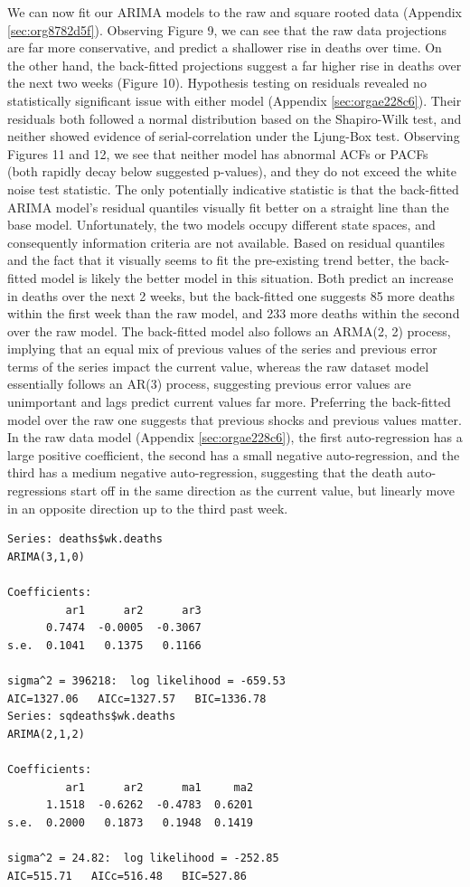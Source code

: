 \documentclass[a4paper]{article}
\begin{document}
\hfill \newline

We can now fit our ARIMA models to the raw and square rooted data (Appendix \ref{sec:org8782d5f}). Observing Figure 9, we can see that the raw data projections are far more conservative, and predict a shallower rise in deaths over time. On the other hand, the back-fitted projections suggest a far higher rise in deaths over the next two weeks (Figure 10). Hypothesis testing on residuals revealed no statistically significant issue with either model (Appendix \ref{sec:orgae228c6}). Their residuals both followed a normal distribution based on the Shapiro-Wilk test, and neither showed evidence of serial-correlation under the Ljung-Box test. Observing Figures 11 and 12, we see that neither model has abnormal ACFs or PACFs (both rapidly decay below suggested p-values), and they do not exceed the white noise test statistic. The only potentially indicative statistic is that the back-fitted ARIMA model's residual quantiles visually fit better on a straight line than the base model. Unfortunately, the two models occupy different state spaces, and consequently information criteria are not available. Based on residual quantiles and the fact that it visually seems to fit the pre-existing trend better, the back-fitted model is likely the better model in this situation. Both predict an increase in deaths over the next 2 weeks, but the back-fitted one suggests 85 more deaths within the first week than the raw model, and 233 more deaths within the second over the raw model. The back-fitted model also follows an ARMA(2, 2) process, implying that an equal mix of previous values of the series and previous error terms of the series impact the current value, whereas the raw dataset model essentially follows an AR(3) process, suggesting previous error values are unimportant and lags predict current values far more. Preferring the back-fitted model over the raw one suggests that previous shocks and previous values matter. In the raw data model (Appendix \ref{sec:orgae228c6}), the first auto-regression has a large positive coefficient, the second has a small negative auto-regression, and the third has a medium negative auto-regression, suggesting that the death auto-regressions start off in the same direction as the current value, but linearly move in an opposite direction up to the third past week.

\label{orgb2e393f}
\begin{verbatim}
Series: deaths$wk.deaths 
ARIMA(3,1,0) 

Coefficients:
         ar1      ar2      ar3
      0.7474  -0.0005  -0.3067
s.e.  0.1041   0.1375   0.1166

sigma^2 = 396218:  log likelihood = -659.53
AIC=1327.06   AICc=1327.57   BIC=1336.78
Series: sqdeaths$wk.deaths 
ARIMA(2,1,2) 

Coefficients:
         ar1      ar2      ma1     ma2
      1.1518  -0.6262  -0.4783  0.6201
s.e.  0.2000   0.1873   0.1948  0.1419

sigma^2 = 24.82:  log likelihood = -252.85
AIC=515.71   AICc=516.48   BIC=527.86
\end{verbatim}
\end{document}

